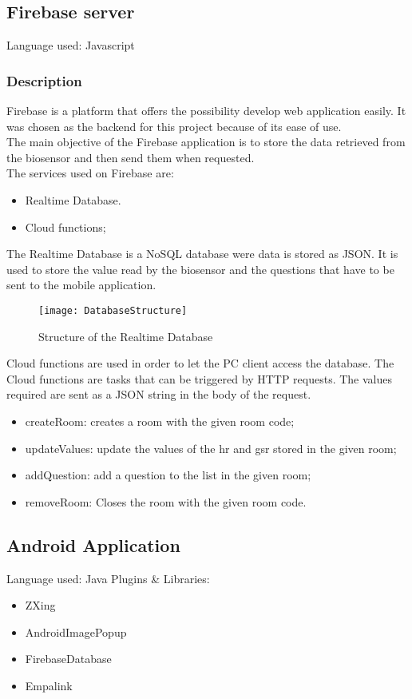 \subsection{Firebase server}
Language used: Javascript

\subsubsection{Description}
Firebase is a platform that offers the possibility develop web application easily. It was chosen as the backend for this project because of its ease of use.\\
The main objective of the Firebase application is to store the data retrieved from the biosensor and then send them when requested.\\
The services used on Firebase are:
\begin{itemize}
	\item Realtime Database.
	\item Cloud functions;
\end{itemize}
The Realtime Database is a NoSQL database were data is stored as JSON. It is used to store the value read by the biosensor and the questions that have to be sent to the mobile application.
\begin{figure}[H]
	\centering
	\texttt{[image: DatabaseStructure]}
	\caption{Structure of the Realtime Database}
\end{figure}
Cloud functions are used in order to let the PC client access the database. The Cloud functions are tasks that can be triggered by HTTP requests. The values required are sent as a JSON string in the body of the request.
\begin{itemize}
	\item createRoom: creates a room with the given room code;
	\item updateValues: update the values of the hr and gsr stored in the given room;
	\item addQuestion: add a question to the list in the given room;
	\item removeRoom: Closes the room with the given room code.
\end{itemize}

\subsection{Android Application}
Language used: Java
Plugins \& Libraries:
\begin{itemize}
	\item ZXing
	\item AndroidImagePopup
	\item FirebaseDatabase
	\item Empalink
\end{itemize}


